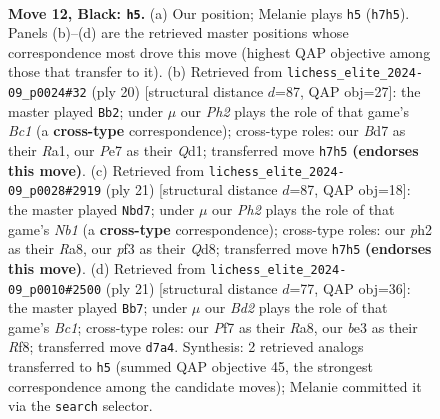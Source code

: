 \documentclass[11pt]{article}
\begin{document}
\clearpage

\begin{figure}[p]\centering
\begin{subfigure}{0.46\textwidth}\centering
\resizebox{\linewidth}{!}{%
\newchessgame
\chessboard[
  setfen={r2qkb1r/pp1bpp1p/n2p1np1/8/3NP3/2NBBP2/PPP2QPP/2K1R2R b kq - 10 12},
  showmover=false,
  pgfstyle=straightmove, color=movearrow, markmove={h7-h5}
]}
\caption{}
\end{subfigure}\hfill
\begin{subfigure}{0.46\textwidth}\centering
\resizebox{\linewidth}{!}{%
\newchessgame
\chessboard[
  setfen={r1bq1rk1/pp2ppbp/2n2np1/8/2Pp4/PN1P1NP1/4PPBP/R1BQ1RK1 w - - 1 11},
  showmover=false,
  pgfstyle=straightmove, color=movearrow, markmove={c1-b2}
]}
\caption{}
\end{subfigure}
\\[4pt]
\begin{subfigure}{0.46\textwidth}\centering
\resizebox{\linewidth}{!}{%
\newchessgame
\chessboard[
  setfen={rnbq1rk1/1p2ppbp/p2p1np1/3P4/3N4/2N3PP/PP2PPB1/R1BQ1RK1 b - - 1 11},
  showmover=false,
  pgfstyle=straightmove, color=movearrow, markmove={b8-d7}
]}
\caption{}
\end{subfigure}\hfill
\begin{subfigure}{0.46\textwidth}\centering
\resizebox{\linewidth}{!}{%
\newchessgame
\chessboard[
  setfen={r1bq1rk1/4ppbp/p1np1np1/1p6/4PP2/2NB1N2/PPP3PP/R1B1QR1K b - - 1 11},
  showmover=false,
  pgfstyle=straightmove, color=movearrow, markmove={c8-b7}
]}
\caption{}
\end{subfigure}
\caption{\textbf{Move 12, Black: \texttt{h5}.} (a) Our position; Melanie plays \texttt{h5} (\texttt{h7h5}). Panels (b)--(d) are the retrieved master positions whose correspondence most drove this move (highest QAP objective among those that transfer to it). (b) Retrieved from \texttt{lichess\_elite\_2024-09\_p0024\#32} (ply 20) [structural distance $d$=87, QAP obj=27]: the master played \texttt{Bb2}; under $\mu$ our \emph{Ph2} plays the role of that game's \emph{Bc1} (a \textbf{cross-type} correspondence); cross-type roles: our \emph{B}d7 as their \emph{R}a1, our \emph{P}e7 as their \emph{Q}d1; transferred move \texttt{h7h5} \textbf{(endorses this move)}. (c) Retrieved from \texttt{lichess\_elite\_2024-09\_p0028\#2919} (ply 21) [structural distance $d$=87, QAP obj=18]: the master played \texttt{Nbd7}; under $\mu$ our \emph{Ph2} plays the role of that game's \emph{Nb1} (a \textbf{cross-type} correspondence); cross-type roles: our \emph{p}h2 as their \emph{R}a8, our \emph{p}f3 as their \emph{Q}d8; transferred move \texttt{h7h5} \textbf{(endorses this move)}. (d) Retrieved from \texttt{lichess\_elite\_2024-09\_p0010\#2500} (ply 21) [structural distance $d$=77, QAP obj=36]: the master played \texttt{Bb7}; under $\mu$ our \emph{Bd2} plays the role of that game's \emph{Bc1}; cross-type roles: our \emph{P}f7 as their \emph{R}a8, our \emph{b}e3 as their \emph{R}f8; transferred move \texttt{d7a4}. Synthesis: 2 retrieved analogs transferred to \texttt{h5} (summed QAP objective 45, the strongest correspondence among the candidate moves); Melanie committed it via the \texttt{search} selector.}
\label{fig:thought-m23}
\end{figure}
\end{document}
